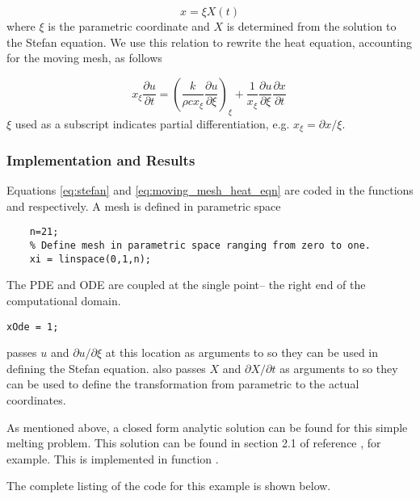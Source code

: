 \documentclass{article}
\begin{document}
\begin{equation}\label{eq:moving_mesh_param_eqn}
	x=\xi X(t)
\end{equation}
where $\xi$ is the parametric coordinate and $X$ is determined from the solution to the
Stefan equation. We use this relation to rewrite the heat equation, accounting for the
moving mesh, as follows

\begin{equation}\label{eq:moving_mesh_heat_eqn}
	x_\xi\frac{\partial u}{\partial t} = \left(\frac{k}{\rho c x_\xi}\frac{\partial u}{\partial\xi}\right)_\xi + 	
	\frac{1}{x_\xi}\frac{\partial u}{\partial\xi}\frac{\partial x}{\partial t}
\frac{}{}
\end{equation}
$\xi$ used as a subscript indicates partial differentiation, e.g. $x_\xi=\partial x/\xi$.


\subsubsection{Implementation and Results }

Equations \eqref{eq:stefan} and \eqref{eq:moving_mesh_heat_eqn} are coded in the
functions  and  respectively. A mesh is defined in
parametric space

\begin{lstlisting}
	n=21;
	% Define mesh in parametric space ranging from zero to one.
	xi = linspace(0,1,n);
\end{lstlisting}

The PDE and ODE are coupled at the single point-- the right end of the
computational domain.
\begin{lstlisting}
xOde = 1;
\end{lstlisting}
\pde passes $u$ and $\partial u/\partial\xi$ at this location as arguments to 
 so they can be used in defining the Stefan equation.
\pde also passes $X$ and $\partial X/\partial t$ as arguments to 
so they can be used to define the transformation from parametric to the actual
coordinates.

As mentioned above, a closed form analytic solution can be found for this simple
melting problem. This solution can be found in section 2.1 of reference \cite{meltingFreezing}, for example. This is implemented in function
.

The complete listing of the \ml code for this example is shown below.

\bigskip
\end{document}

